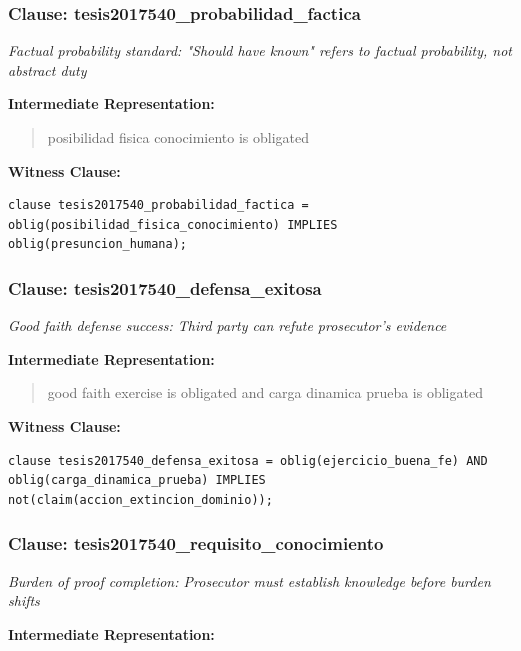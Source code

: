 \documentclass[11pt,a4paper]{article}
\begin{document}
\subsubsection{Clause: tesis2017540\_probabilidad\_factica}

\textit{Factual probability standard: "Should have known" refers to factual probability, not abstract duty}

\textbf{Intermediate Representation:}

\begin{quote}
posibilidad fisica conocimiento is obligated
\end{quote}

\textbf{Witness Clause:}

\begin{lstlisting}[style=witnessstyle, language=Witness]
clause tesis2017540_probabilidad_factica = oblig(posibilidad_fisica_conocimiento) IMPLIES oblig(presuncion_humana);
\end{lstlisting}

\subsubsection{Clause: tesis2017540\_defensa\_exitosa}

\textit{Good faith defense success: Third party can refute prosecutor's evidence}

\textbf{Intermediate Representation:}

\begin{quote}
good faith exercise is obligated and carga dinamica prueba is obligated
\end{quote}

\textbf{Witness Clause:}

\begin{lstlisting}[style=witnessstyle, language=Witness]
clause tesis2017540_defensa_exitosa = oblig(ejercicio_buena_fe) AND oblig(carga_dinamica_prueba) IMPLIES not(claim(accion_extincion_dominio));
\end{lstlisting}

\subsubsection{Clause: tesis2017540\_requisito\_conocimiento}

\textit{Burden of proof completion: Prosecutor must establish knowledge before burden shifts}

\textbf{Intermediate Representation:}
\end{document}
